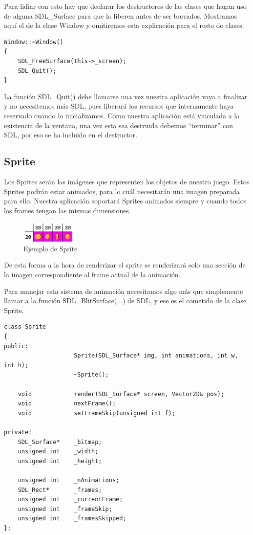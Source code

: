 \documentclass[parskip=half*]{scrartcl}
\begin{document}
				Para lidiar con esto hay que declarar los destructores de las clases que hagan uso de alguna SDL\_Surface para que la liberen antes de ser borrados. Mostramos aqu\'i el de la clase Window y omitiremos esta explicaci\'on para el resto de clases.

				\begin{verbatim}
Window::~Window()
{
    SDL_FreeSurface(this->_screen);
    SDL_Quit();
}
				\end{verbatim}

				La funci\'on SDL\_Quit() debe llamarse una vez nuestra aplicaci\'on vaya a finalizar y no necesitemos m\'as SDL, pues liberar\'a los recursos que internamente haya reservado cuando lo inicializamos. Como nuestra aplicaci\'on est\'a vinculada a la existencia de la ventana, una vez esta sea destruida debemos ``terminar'' con SDL, por eso se ha incluido en el destructor.

	\subsection{Sprite}
		Los Sprites ser\'an las im\'agenes que representen los objetos de nuestro juego. Estos Sprites podr\'an estar animados, para lo cu\'al necesitar\'an una imagen preparada para ello. Nuestra aplicaci\'on soportar\'a Sprites animados siempre y cuando todos los frames tengan las mismas dimensiones.

		\begin{figure}[h]
			\centering
			\includegraphics{sprite_example.png}
			\caption{Ejemplo de Sprite}
		\end{figure}

		De esta forma a la hora de renderizar el sprite se renderizar\'a solo una secci\'on de la imagen correspondiente al frame actual de la animaci\'on.

		Para manejar esta sistema de animaci\'on necesitamos algo m\'as que simplemente llamar a la funci\'on SDL\_BlitSurface(...) de SDL, y ese es el cometido de la clase Sprite.

		\begin{verbatim}
class Sprite
{
public:
                    Sprite(SDL_Surface* img, int animations, int w, int h);
                    ~Sprite();
    
    void            render(SDL_Surface* screen, Vector2D& pos);
    void            nextFrame();
    void            setFrameSkip(unsigned int f);
    
private:
    SDL_Surface*    _bitmap;
    unsigned int    _width;
    unsigned int    _height;

    unsigned int    _nAnimations;
    SDL_Rect*       _frames;
    unsigned int    _currentFrame;    
    unsigned int    _frameSkip;
    unsigned int    _framesSkipped;
};
		\end{verbatim}
\end{document}
